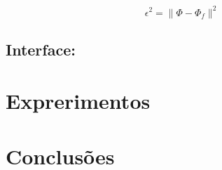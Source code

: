 \documentclass[10pt,a4paper]{article}
\begin{document}
\begin{equation}
\epsilon^2=\|\Phi-\Phi_f\|^2
\end{equation}

\subsection*{Interface:}
\section{Exprerimentos}

\section{Conclusões}


\begin{small}
  
\end{small}
\end{document}
